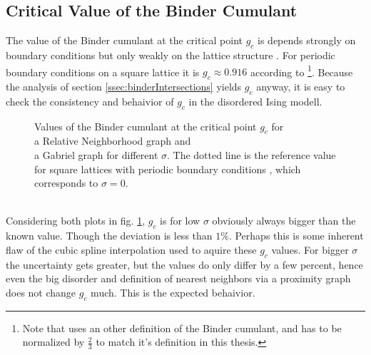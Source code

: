 \subsection{Critical Value of the Binder Cumulant}
    The value of the Binder cumulant at the critical point \(g_c\) is
    depends strongly on boundary conditions but only weakly on the lattice
    structure \cite{BinderValue}. For periodic boundary conditions on a
    square lattice it is \(g_c \approx 0.916\) according to \cite{BinderValue}
        \footnote{Note that \cite{BinderValue} uses an other definition of
            the Binder cumulant, and has to be normalized by \(\frac{2}{3}\)
            to match it's definition in this thesis.}.
    Because the analysis of section \ref{ssec:binderIntersections}
    yields \(g_c\) anyway, it is easy to check the consistency and
    behaivior of \(g_c\) in the disordered Ising modell.\\
    \begin{figure}[htbp]
        \centering
        \caption[Values of the Binder cumulant at the critical point $g_c$]
        {
            Values of the Binder cumulant at the critical point \(g_c\)
            for\\
             a Relative Neighborhood graph and\\
             a Gabriel graph for different \(\sigma\).
            The dotted line is the reference value for square lattices
            with periodic boundary conditions \cite{BinderValue}, which
            corresponds to \(\sigma = 0\).
        }
        \label{fig:TcG}
    \end{figure}\\
    Considering both plots in fig. \ref{fig:TcG}, \(g_c\) is for low
    \(\sigma\) obviously always bigger than the known value. Though the
    deviation is less than \(1\%\). Perhaps this is some inherent flaw
    of the cubic spline interpolation used to aquire these \(g_c\) values.
    For bigger \(\sigma\) the uncertainty gets greater, but the values
    do only differ by a few percent, hence even the big disorder and
    definition of nearest neighbors via a proximity graph does not change
    \(g_c\) much. This is the expected behaivior.


